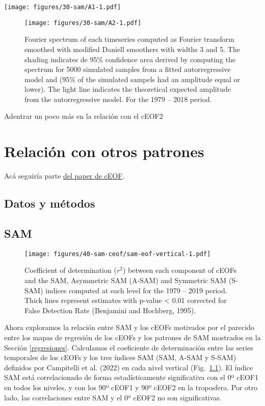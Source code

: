 \documentclass[12pt,oneside]{reedthesis}
\begin{document}
\texttt{[image: figures/30-sam/A1-1.pdf]}

\begin{figure}
\centering
\texttt{[image: figures/30-sam/A2-1.pdf]}
\caption{\label{fig:A2}Fourier spectrum of each timeseries computed as Fourier transform smoothed with modified Daniell smoothers with widths 3 and 5. The shading indicates de 95\% confidence area derived by computing the spectrum for 5000 simulated samples from a fitted autorregressive model and (95\% of the simulated sampels had an amplitude equal or lower). The light line indicates the theoretical expected amplitude from the autorregressive model. For the 1979 -- 2018 period.}
\end{figure}
Adentrar un poco más en la relación con el cEOF2

\hypertarget{relaciuxf3n-con-otros-patrones}{%
\chapter{Relación con otros patrones}\label{relaciuxf3n-con-otros-patrones}}

Acá seguiría parte \href{https://github.com/eliocamp/shceof}{del paper de cEOF}.

\hypertarget{datos-y-muxe9todos-2}{%
\section{Datos y métodos}\label{datos-y-muxe9todos-2}}

\hypertarget{sam}{%
\section{SAM}\label{sam}}


\begin{figure}
\centering
\texttt{[image: figures/40-sam-ceof/sam-eof-vertical-1.pdf]}
\caption{\label{fig:sam-eof-vertical}Coefficient of determination (\(r^2\)) between each component of cEOFs and the SAM, Asymmetric SAM (A-SAM) and Symmetric SAM (S-SAM) indices computed at each level for the 1979 -- 2019 period. Thick lines represent estimates with p-value \textless{} 0.01 corrected for False Detection Rate (Benjamini and Hochberg, 1995).}
\end{figure}
Ahora exploramos la relación entre SAM y los cEOFs motivados por el parecido entre los mapas de regresión de los cEOFs y los patrones de SAM mostrados en la Sección \ref{regresiones}.
Calculamos el coeficiente de determinación entre las series temporales de los cEOFs y los tres índices SAM (SAM, A-SAM y S-SAM) definidos por Campitelli et al. (2022) en cada nivel vertical (Fig.~\ref{fig:sam-eof-vertical}).
El índice SAM está correlacionado de forma estadísticamente significativa con el 0º cEOF1 en todos los niveles, y con los 90º cEOF1 y 90º cEOF2 en la troposfera.
Por otro lado, las correlaciones entre SAM y el 0º cEOF2 no son significativas.
\end{document}
